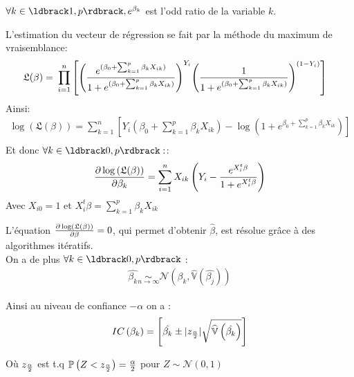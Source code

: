 \documentclass{book}
\begin{document}
\noindent
$\forall k \in \ldbrack 1,p \rdbrack, e^{\beta_k}$ est l'odd ratio de la variable $k$.\\
\bigskip

\noindent
L'estimation du vecteur de régression se fait par la méthode du maximum de vraisemblance:
\begin{align*}
\mathfrak{L}(\beta) =& ~ \prod_{i=1}^n \left[
{\left(  {{e^{(\beta_0 + \sum_{k=1}^p {\beta_k X_{ik}})}} \over {1+{e^{(\beta_0 + \sum_{k=1}^p {\beta_k X_{ik}})}}}  } \right)}^{Y_i} {\left( 1 \over {1+ {e^{(\beta_0 + \sum_{k=1}^p {\beta_k X_{ik}})}}}   \right)}^{(1-Y_i)} \right]
\end{align*}
Ainsi: 
\begin{align*}
\log \left( \mathfrak{L}(\beta) \right)  = 
\sum_{k=1}^n {\left[ Y_i \left( \beta_0 + \sum_{k=1}^p {\beta_k X_{ik}}  \right) 
- \log \left( 1 + e^{\beta_0 +  \sum_{k=1}^p {\beta_k X_{ik}}  } \right)
\right]} \\
\end{align*}
Et donc $ \forall k \in \ldbrack 0,p \rdbrack :  $:
\begin{align*}
{{\partial  \log \left( \mathfrak{L}(\beta) \right)} \over {\partial \beta_k} }= 
\sum_{i=1}^n {X_{ik} \left( Y_i - {{e^{X_i^t \beta}} \over {1+ e^{X_i^t \beta}}} \right)}
\end{align*}
Avec $X_{i0} = 1 $ et $ X_i^t \beta = \sum_{k = 1}^p {\beta_k X_{ik}} $

\noindent
L'équation $ {{\partial  \log \left( \mathfrak{L}(\beta) \right)} \over {\partial \beta} } = 0  $, qui permet d'obtenir $\hat{\beta}$, est résolue grâce à des algorithmes itératifs.\\


\noindent
On a de plus $\forall k \in \ldbrack 0,p \rdbrack$ :
\begin{align*}
\hat{\beta_k} \underset{n \rightarrow \infty}{\sim} \mathcal{N} \left( \beta_k,\widehat{\mathbb{V}} \left(  \hat{\beta_j}\right) \right)
\end{align*}

\noindent
Ainsi au niveau de confiance $-\alpha$ on a :
\begin{align*}
IC \left( \beta_k \right) =
 \left[
  \hat{\beta_k} \pm |z_{{\alpha} \over {2}}| \sqrt{\widehat{\mathbb{V}}\left( \hat{\beta_k} \right)}
\right]\\
\end{align*}

\noindent
Où $ z_{ {\alpha} \over {2}} $ est t.q $ \mathbb{P}\left( Z <  z_{ {\alpha} \over {2}} \right) = {{\alpha} \over {2}}$ pour $ Z \sim \mathcal{N}(0,1) $
\end{document}
